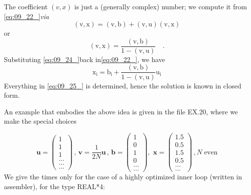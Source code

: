The coefficient $(v, x)$ is just a (generally complex) number; we
compute it from \ref{eq:09_22_}\textit{via}
\begin{equation}
 \label{eq:09_23_}
    \mathrm{(v,x)=(v,b)+(v,u)(v,x)}
\end{equation}
or
\begin{equation}
 \label{eq:09_24_}
    \mathrm{(v,x)=\frac{(v,b)}{1-(v,u)}\quad .}
\end{equation}
Substituting \ref{eq:09_24_}back in\ref{eq:09_22_}, we have
\begin{equation}
 \label{eq:09_25_}
    \mathrm{x_i=b_i+\frac{(v,b)}{1-(v,u)}u_i}
\end{equation}
Everything in \ref{eq:09_25_} is determined, hence the solution is known in
closed form.

An example that embodies the above idea is given in the file
EX.20, where we make the special choices

\begin{equation*}
    \mathbf{u}=
    \begin{pmatrix}
        1\\ 
        1\\ 
        1\\ 
        \dots\\ 
        \dots\\ 
        \dots
    \end{pmatrix}
    \, ,\, 
    \mathbf{v}=\frac{1}{2N} \mathbf{u}\, , \, 
    \mathbf{b} =
    \begin{pmatrix}
        1\\ 
        0\\ 
        1\\ 
        0\\ 
        \dots\\ 
        \dots
    \end{pmatrix}
    ,\, \,  
    \mathbf{x}=
    \begin{pmatrix}
        1.5\\ 
        0.5\\ 
        1.5\\ 
        0.5\\ 
        \dots\\ 
        \dots
    \end{pmatrix}
    \, , N \; \textrm{even}
\end{equation*}
We give the times only for the case of a highly optimized inner
loop (written in assembler), for the type REAL*4:

